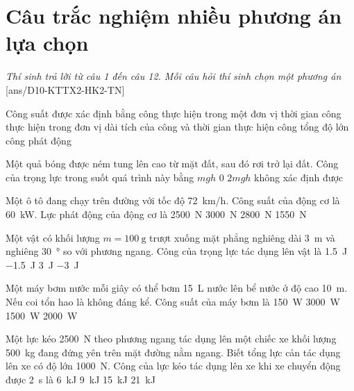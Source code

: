 \section{Câu trắc nghiệm nhiều phương án lựa chọn}
\textit{Thí sinh trả lời từ câu 1 đến câu 12. Mỗi câu hỏi thí sinh chọn một phương án}
\setcounter{ex}{0}
[ans/D10-KTTX2-HK2-TN]
\begin{ex}
	Công suất được xác định bằng
	\choice
	{\True công thực hiện trong một đơn vị thời gian}
	{công thực hiện trong đơn vị dài}
	{tích của công và thời gian thực hiện công}
	{tổng độ lớn công phát động}
	\loigiai{}
\end{ex}
\begin{ex}
	Một quả bóng được ném tung lên cao từ mặt đất, sau đó rơi trở lại đất. Công của trọng lực trong suốt quá trình này bằng
	\choice
	{$mgh$}
	{\True $0$}
	{$2mgh$}
	{không xác định được}
	\loigiai{}
\end{ex}
\begin{ex}
	Một ô tô đang chạy trên đường với tốc độ \SI{72}{\kilo\meter/\hour}. Công suất của động cơ là \SI{60}{\kilo\watt}. Lực phát động của động cơ là
	\choice
	{\SI{2500}{\newton}}
	{\True \SI{3000}{\newton}}
	{\SI{2800}{\newton}}
	{\SI{1550}{\newton}}
	\loigiai{}
\end{ex}
\begin{ex}
Một vật có khối lượng $m=\SI{100}{\gram}$ trượt xuống mặt phẳng nghiêng dài \SI{3}{\meter} và nghiêng \SI{30}{\degree} so với phương ngang. Công của trọng lực tác dụng lên vật là
	\choice
	{\True \SI{1.5}{\joule}}
	{\SI{-1.5}{\joule}}
	{\SI{3}{\joule}}
	{\SI{-3}{\joule}}
	\loigiai{}
\end{ex}
\begin{ex}
	Một máy bơm nước mỗi giây có thể bơm \SI{15}{\liter} nước lên bể nước ở độ cao \SI{10}{\meter}. Nếu coi tổn hao là không đáng kể. Công suất của máy bơm là
	\choice
	{\SI{150}{\watt}}
	{\SI{3000}{\watt}}
	{\True \SI{1500}{\watt}}
	{\SI{2000}{\watt}}
	\loigiai{}
\end{ex}
\begin{ex}
	Một lực kéo \SI{2500}{\newton} theo phương ngang tác dụng lên một chiếc xe khối lượng \SI{500}{\kilogram} đang đứng yên trên mặt đường nằm ngang. Biết tổng lực cản tác dụng lên xe có độ lớn \SI{1000}{\newton}. Công của lực kéo tác dụng lên xe khi xe chuyển động được \SI{2}{\second} là 
	\choice
	{\SI{6}{\kilo\joule}}
	{\SI{9}{\kilo\joule}}
	{\True \SI{15}{\kilo\joule}}
	{\SI{21}{\kilo\joule}}
	\loigiai{}
\end{ex}
